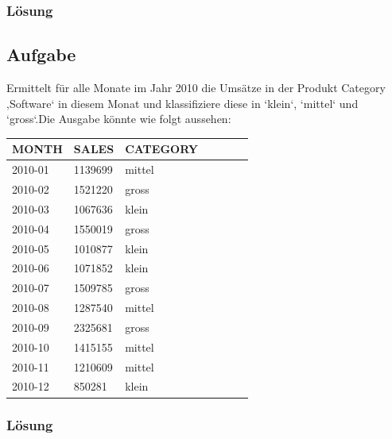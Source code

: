 \subsubsection*{Lösung}
\label{subsubsec:uebung_12.aufgabe_12.loesung}


\subsection{Aufgabe}
\label{subsec:uebung_12.aufgabe_13}
Ermittelt für alle Monate im Jahr 2010 die Umsätze in der Produkt Category ‚Software‘ in diesem Monat und klassifiziere diese in ‘klein‘, ‘mittel‘ und ‘gross‘.Die Ausgabe könnte wie folgt aussehen:

\begin{table}[H]
  \centering
  \ttfamily
  \begin{tabular}{|l|l|l|l|l|l|l|}
    \hline
    \textbf{MONTH}   & \textbf{SALES}   & \textbf{CATEGORY} \\
    \hline
    2010-01 & 1139699 & mittel \\
    2010-02 & 1521220 & gross \\
    2010-03 & 1067636 & klein \\
    2010-04 & 1550019 & gross \\
    2010-05 & 1010877 & klein \\
    2010-06 & 1071852 & klein \\
    2010-07 & 1509785 & gross \\
    2010-08 & 1287540 & mittel \\
    2010-09 & 2325681 & gross \\
    2010-10 & 1415155 & mittel \\
    2010-11 & 1210609 & mittel \\
    2010-12 & 850281  & klein \\
     \hline
  \end{tabular}
\end{table}

\subsubsection*{Lösung}
\label{subsubsec:uebung_12.aufgabe_13.loesung}


